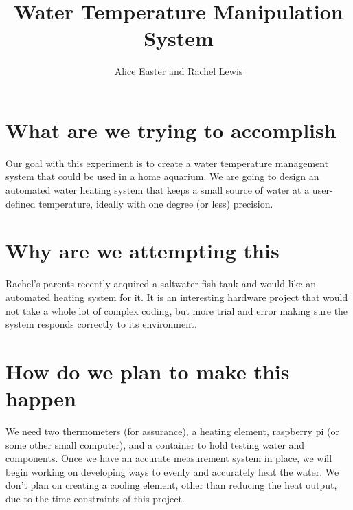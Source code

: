 \documentclass{article}
\title{Water Temperature Manipulation System}
\author{Alice Easter and Rachel Lewis}
\begin{document}
	\maketitle
	\section{What are we trying to accomplish}
	Our goal with this experiment is to create a water temperature management system that could be used in a home aquarium. We are going to design an automated water heating system that keeps a small source of water at a user-defined temperature, ideally with one degree (or less) precision.
	\section{Why are we attempting this}
	Rachel’s parents recently acquired a saltwater fish tank and would like an automated heating system for it. It is an interesting hardware project that would not take a whole lot of complex coding, but more trial and error making sure the system responds correctly to its environment.
	\section{How do we plan to make this happen}
	We need two thermometers (for assurance), a heating element, raspberry pi (or some other small computer), and a container to hold testing water and components. Once we have an accurate measurement system in place, we will begin working on developing ways to evenly and accurately heat the water. We don't plan on creating a cooling element, other than reducing the heat output, due to the time constraints of this project.
\end{document}
